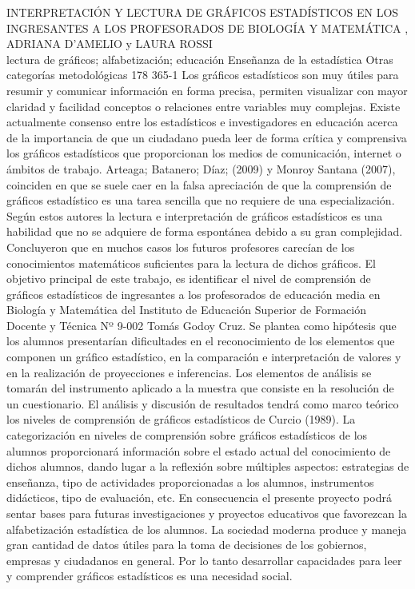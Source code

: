\A
{INTERPRETACIÓN Y LECTURA DE GRÁFICOS ESTADÍSTICOS EN LOS INGRESANTES A LOS PROFESORADOS DE BIOLOGÍA Y MATEMÁTICA}
{, ADRIANA D'AMELIO y LAURA ROSSI}
{
\\}
{lectura de gráficos; alfabetización; educación} 
 {Enseñanza de la estadística} 
 {Otras categorías metodológicas} 
 {178} 
 {365-1}
{Los gráficos estadísticos son muy útiles para resumir y comunicar información en forma precisa, permiten visualizar con mayor claridad y facilidad conceptos o relaciones entre variables muy complejas. Existe actualmente consenso entre los estadísticos e investigadores en educación acerca de la importancia de que un ciudadano pueda leer de forma crítica y comprensiva los gráficos estadísticos que proporcionan los medios de comunicación, internet o ámbitos de trabajo. Arteaga; Batanero; Díaz; (2009) y Monroy Santana (2007), coinciden en que se suele caer en la falsa apreciación de que la comprensión de gráficos estadístico es una tarea sencilla que no requiere de una especialización. Según estos autores la lectura e interpretación de gráficos estadísticos es una habilidad que no se adquiere de forma espontánea debido a su gran complejidad. Concluyeron que en muchos casos los futuros profesores carecían de los conocimientos matemáticos suficientes para la lectura de dichos gráficos. El objetivo principal de este trabajo, es identificar el nivel de comprensión de gráficos estadísticos de ingresantes a los profesorados de educación media en Biología y Matemática del Instituto de Educación Superior de Formación Docente y Técnica Nº 9-002 Tomás Godoy Cruz. Se plantea como hipótesis que los alumnos presentarían dificultades en el reconocimiento de los elementos que componen un gráfico estadístico, en la comparación e interpretación de valores y en la realización de proyecciones e inferencias. Los elementos de análisis se tomarán del instrumento aplicado a la muestra que consiste en la resolución de un cuestionario. El análisis y discusión de resultados tendrá como marco teórico los niveles de comprensión de gráficos estadísticos de Curcio (1989). La categorización en niveles de comprensión sobre gráficos estadísticos de los alumnos proporcionará información sobre el estado actual del conocimiento de dichos alumnos, dando lugar a la reflexión sobre múltiples aspectos: estrategias de enseñanza, tipo de actividades proporcionadas a los alumnos, instrumentos didácticos, tipo de evaluación, etc. En consecuencia el presente proyecto podrá sentar bases para futuras investigaciones y proyectos educativos que favorezcan la alfabetización estadística de los alumnos. La sociedad moderna produce y maneja gran cantidad de datos útiles para la toma de decisiones de los gobiernos, empresas y ciudadanos en general. Por lo tanto desarrollar capacidades para leer y comprender gráficos estadísticos es una necesidad social.}
